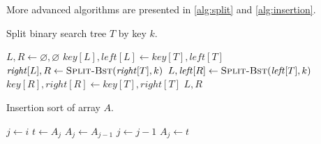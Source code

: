 More advanced algorithms are presented in \autoref{alg:split} and \ref{alg:insertion}.

\begin{algorithm}[t]
	\caption{Split binary search tree $T$ by key $k$.}
	\begin{algorithmic}[1]
				\State $L,R \gets \varnothing,\varnothing$
				\State $\mathit{key}[L], \mathit{left}[L] \gets \mathit{key}[T], \mathit{left}[T]$
				\State $\mathit{right}[L], R \gets \mbox{\Call{Split-Bst}{$\mathit{right}[T], k$}}$
			\Else{}
				\State $L, \mathit{left}[R] \gets \mbox{\Call{Split-Bst}{$\mathit{left}[T], k$}}$
				\State $\mathit{key}[R], \mathit{right}[R] \gets \mathit{key}[T], \mathit{right}[T]$
			\EndIf
			\State \Return $L,R$
		\EndFunction
	\end{algorithmic}
	\label{alg:split}
\end{algorithm}

\begin{algorithm}[b]
	\caption{Insertion sort of array $A$.}
	\begin{algorithmic}[1]
				\State $j \gets i$
				\State $t \gets A_j$
					\State $A_j \gets A_{j-1}$
					\State $j \gets j-1$
				\EndWhile
				\State $A_j \gets t$
			\EndFor
		\EndProcedure
	\end{algorithmic}
	\label{alg:insertion}
\end{algorithm}

\endinput